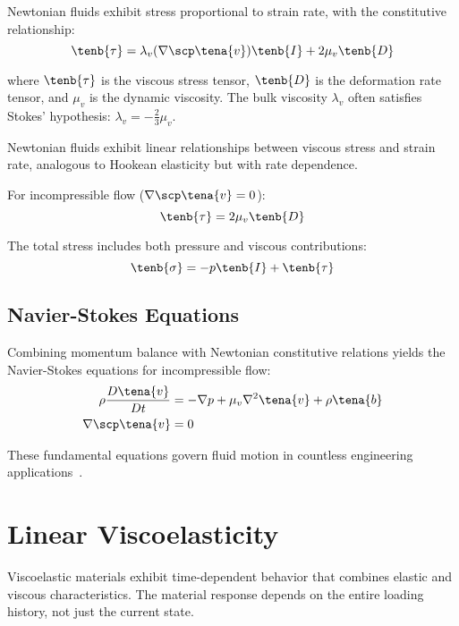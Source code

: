 Newtonian fluids exhibit stress proportional to strain rate, with the constitutive relationship:
\begin{equation}
\tenb{\tau} = \lambda_v (\nabla \scp \tena{v}) \tenb{I} + 2\mu_v \tenb{D}
\end{equation}

where $\tenb{\tau}$ is the viscous stress tensor, $\tenb{D}$ is the deformation rate tensor, and $\mu_v$ is the dynamic viscosity. The bulk viscosity $\lambda_v$ often satisfies Stokes' hypothesis: $\lambda_v = -\frac{2}{3}\mu_v$.

\begin{keypoint}
Newtonian fluids exhibit linear relationships between viscous stress and strain rate, analogous to Hookean elasticity but with rate dependence.
\end{keypoint}

For incompressible flow ($\nabla \scp \tena{v} = 0$):
\begin{equation}
\tenb{\tau} = 2\mu_v \tenb{D}
\end{equation}

The total stress includes both pressure and viscous contributions:
\begin{equation}
\tenb{\sigma} = -p\tenb{I} + \tenb{\tau}
\end{equation}

\subsection{Navier-Stokes Equations}

Combining momentum balance with Newtonian constitutive relations yields the Navier-Stokes equations for incompressible flow:
\begin{align}
\rho \frac{D\tena{v}}{Dt} &= -\nabla p + \mu_v \nabla^2 \tena{v} + \rho \tena{b}\\
\nabla \scp \tena{v} &= 0
\end{align}

These fundamental equations govern fluid motion in countless engineering applications~\autocite{Sadd.2019}.

\section{Linear Viscoelasticity}

Viscoelastic materials exhibit time-dependent behavior that combines elastic and viscous characteristics. The material response depends on the entire loading history, not just the current state.

